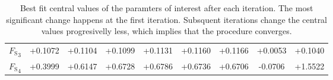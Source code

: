 \begin{table}
\begin{tabular}{ c c c c c c c c c }
    ${F_\text{S}}_3$                    & +0.1072  & +0.1104  & +0.1099  & +0.1131  & +0.1160  & +0.1166  & +0.0053 & +0.1040 \\
    ${F_\text{S}}_4$                    & +0.3999  & +0.6147  & +0.6728  & +0.6786  & +0.6736  & +0.6706  & -0.0706 & +1.5522 \\
    \hline
\end{tabular}
\caption{Best fit central values of the paramters of interest after each iteration. The most significant change happens
         at the first iteration. Subsquent iterations change the central values progresivelly less, which implies that
         the procedure converges.}
\label{pars_convergence}
\end{table}


